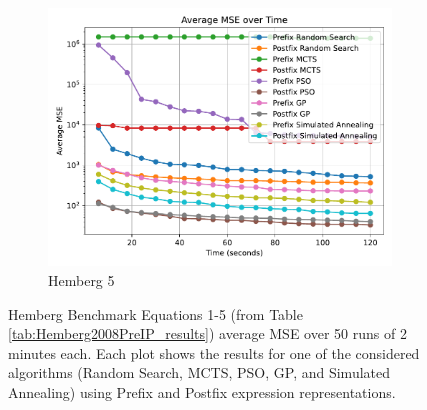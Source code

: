 \documentclass[runningheads]{llncs}
\begin{document}
\begin{figure}
    \vspace{0.5cm}
    
    \begin{subfigure}[b]{0.4\textwidth}
        \includegraphics[width=\linewidth, keepaspectratio]{Hemberg_Benchmarks/Hemberg_Benchmark_5.pdf}
        \caption{Hemberg 5}
        \label{subfig:hemberg_5}
    \end{subfigure}
    
    \caption{Hemberg Benchmark Equations 1-5 (from Table \ref{tab:Hemberg2008PreIP_results}) average MSE over 50 runs of 2 minutes each. Each plot shows the results for one of the considered algorithms (Random Search, MCTS, PSO, GP, and Simulated Annealing) using Prefix and Postfix expression representations.}
    \label{fig:Hemberg_Benchmarks}
\end{figure}

    
    
\end{document}

